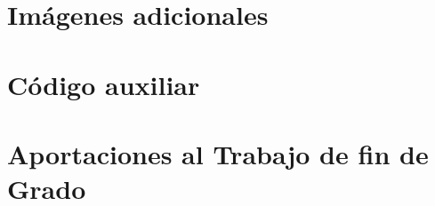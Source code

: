 \chapter{Imágenes adicionales}

\chapter{Código auxiliar}

\chapter{Aportaciones al Trabajo de fin de Grado}


